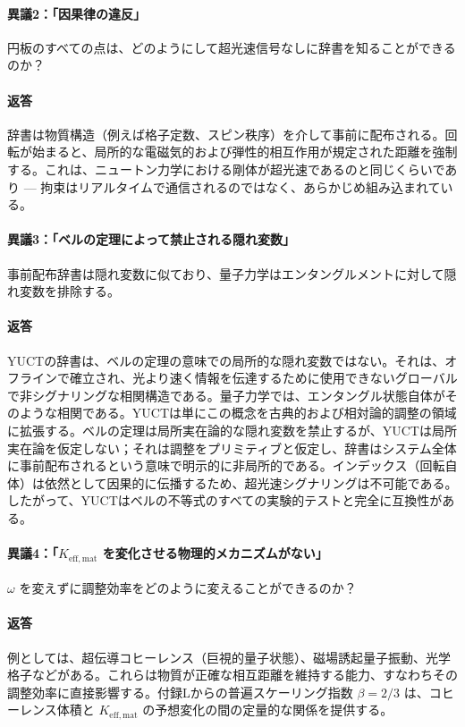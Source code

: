 \documentclass[12pt,a4paper]{article}
\newcommand{\betaf}{\beta}
\begin{document}
	\paragraph{異議2：「因果律の違反」}
	円板のすべての点は、どのようにして超光速信号なしに辞書を知ることができるのか？
	
	\paragraph{返答}
	辞書は物質構造（例えば格子定数、スピン秩序）を介して事前に配布される。回転が始まると、局所的な電磁気的および弾性的相互作用が規定された距離を強制する。これは、ニュートン力学における剛体が超光速であるのと同じくらいであり — 拘束はリアルタイムで通信されるのではなく、あらかじめ組み込まれている。
	
	\paragraph{異議3：「ベルの定理によって禁止される隠れ変数」}
	事前配布辞書は隠れ変数に似ており、量子力学はエンタングルメントに対して隠れ変数を排除する。
	
	\paragraph{返答}
	YUCTの辞書は、ベルの定理の意味での局所的な隠れ変数ではない。それは、オフラインで確立され、光より速く情報を伝達するために使用できないグローバルで非シグナリングな相関構造である。量子力学では、エンタングル状態自体がそのような相関である。YUCTは単にこの概念を古典的および相対論的調整の領域に拡張する。ベルの定理は局所実在論的な隠れ変数を禁止するが、YUCTは局所実在論を仮定しない；それは調整をプリミティブと仮定し、辞書はシステム全体に事前配布されるという意味で明示的に非局所的である。インデックス（回転自体）は依然として因果的に伝播するため、超光速シグナリングは不可能である。したがって、YUCTはベルの不等式のすべての実験的テストと完全に互換性がある。
	
	\paragraph{異議4：「\(K_{\mathrm{eff,mat}}\) を変化させる物理的メカニズムがない」}
	\(\omega\) を変えずに調整効率をどのように変えることができるのか？
	
	\paragraph{返答}
	例としては、超伝導コヒーレンス（巨視的量子状態）、磁場誘起量子振動、光学格子などがある。これらは物質が正確な相互距離を維持する能力、すなわちその調整効率に直接影響する。付録Lからの普遍スケーリング指数 \(\betaf = 2/3\) は、コヒーレンス体積と \(K_{\mathrm{eff,mat}}\) の予想変化の間の定量的な関係を提供する。
	
\end{document}
